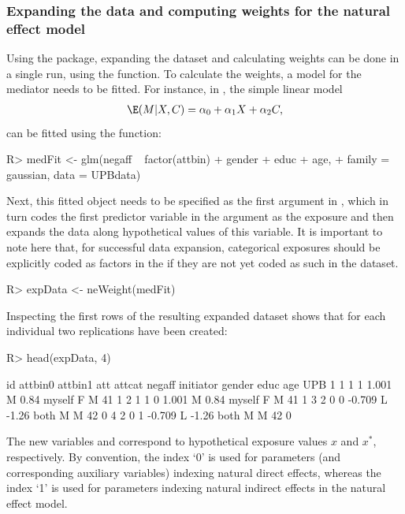 \documentclass[nojss]{jss}
\begin{document}
\subsubsection[]{Expanding the data and computing weights for the natural effect model}
Using the  package, expanding the dataset and calculating weights can be done in a single run, using the  function. 
To calculate the weights, a model for the mediator needs to be fitted. For instance, in , the simple linear model
\begin{align*}
\E(M|X,C) = \alpha_0 + \alpha_1 X + \alpha_2 C,
\end{align*}
can be fitted using the  function:
\begin{Schunk}
\begin{Sinput}
R> medFit <- glm(negaff ~ factor(attbin) + gender + educ + age, 
+    family = gaussian, data = UPBdata)
\end{Sinput}
\end{Schunk}
Next, this fitted object needs to be specified as the first argument in , which in turn codes the first predictor variable in the  argument as the exposure and then expands the data along hypothetical values of this variable. It is important to note here that, for successful data expansion, categorical exposures should be explicitly coded as factors in the  if they are not yet coded as such in the dataset.
\begin{Schunk}
\begin{Sinput}
R> expData <- neWeight(medFit)
\end{Sinput}
\end{Schunk}
Inspecting the first rows of the resulting expanded dataset shows that for each individual two replications have been created:
\begin{Schunk}
\begin{Sinput}
R> head(expData, 4)
\end{Sinput}
\begin{Soutput}
  id attbin0 attbin1    att attcat negaff initiator gender educ age UPB
1  1       1       1  1.001      M   0.84    myself      F    M  41   1
2  1       1       0  1.001      M   0.84    myself      F    M  41   1
3  2       0       0 -0.709      L  -1.26      both      M    M  42   0
4  2       0       1 -0.709      L  -1.26      both      M    M  42   0
\end{Soutput}
\end{Schunk}
The new variables  and  correspond to hypothetical exposure values $x$ and $x^*$, respectively. By convention, the index `0' is used for parameters (and corresponding auxiliary variables) indexing natural direct effects, whereas the index `1' is used for parameters indexing natural indirect effects in the natural effect model.
\end{document}
